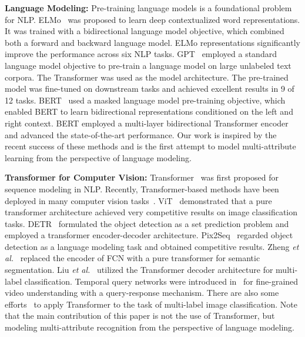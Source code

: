 \documentclass[runningheads]{llncs}
\begin{document}
\textbf{Language Modeling:} Pre-training language models is a foundational problem for NLP. ELMo~\cite{peters2018deep} was proposed to learn deep contextualized word representations. It was trained with a bidirectional language model objective, which combined both a forward and backward language model. ELMo representations significantly improve the performance across six NLP tasks. GPT~\cite{radford2018improving} employed a standard language model objective to pre-train a language model on large unlabeled text corpora. The Transformer was used as the model architecture. The pre-trained model was fine-tuned on downstream tasks and achieved excellent results in 9 of 12 tasks. BERT~\cite{devlin2018bert} used a masked language model pre-training objective, which enabled BERT to learn bidirectional representations conditioned on the left and right context.  BERT employed a multi-layer bidirectional Transformer encoder and advanced the state-of-the-art performance. 
Our work is inspired by the recent success of these methods and is the first attempt to model multi-attribute learning from the perspective of language modeling.



\textbf{Transformer for Computer Vision:} Transformer~\cite{vaswani2017attention} was first proposed for sequence modeling in NLP. Recently, Transformer-based methods have been deployed in many computer vision tasks~\cite{bao2021beit,kaiming2021masked,yu2021frequency,liu2021swin,wang2021end,zhang2021temporal,perrett2021temporal}. ViT~\cite{dosovitskiy2020image} demonstrated that a pure transformer architecture achieved very competitive results on image classification tasks. DETR~\cite{carion2020end} formulated the object detection as a set prediction problem and employed a transformer encoder-decoder architecture. Pix2Seq~\cite{chen2021pix2seq} regarded object detection as a language modeling task and obtained competitive results. Zheng \emph{et al.}~\cite{zheng2021rethinking} replaced the encoder of FCN with a pure transformer
for semantic segmentation. Liu \emph{et al.}~\cite{liu2021query2label} utilized the Transformer decoder architecture for multi-label classification. Temporal query networks were introduced in~\cite{zhang2021temporal} for fine-grained video understanding with a query-response mechanism. 
There are also some efforts~\cite{lanchantin2021general,cheng2021mltr,nguyen2021modular} to apply Transformer to the task of multi-label image classification.
Note that the main contribution of this paper is not the use of Transformer, but modeling multi-attribute recognition from the perspective of language modeling.
\end{document}
